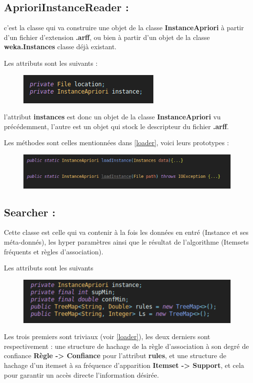 			\subsection*{AprioriInstanceReader :} \label{loader} c'est la classe qui va construire une objet de la classe \textbf{InstanceApriori} à partir d'un fichier d'extension \textbf{.arff}, ou bien à partir d'un objet de la classe \textbf{weka.Instances} classe déjà existant.
			\par Les attributs sont les suivants : 
			\begin{figure}[H]
				\centering
				\includegraphics[width=0.75\linewidth]{apriori/images/data_structs/laoder/properties.png}
			\end{figure}
			\par l'attribut \textbf{instances} est donc un objet de la classe \textbf{InstanceApriori} vu précédemment, l'autre est un objet qui stock le descripteur du fichier \textbf{.arff}.
			
			\par 
			Les méthodes sont celles mentionnées dans \ref{loader}, voici leurs prototypes :
			\begin{figure}[H]
				\centering
				\includegraphics[width=0.75\linewidth]{apriori/images/data_structs/laoder/methods.png}
			\end{figure}
			
			\subsection*{Searcher :} 
			Cette classe est celle qui va contenir à la fois les données en entré (Instance et ses méta-donnés), les hyper paramètres ainsi que le résultat de l'algorithme (Itemsets fréquents et règles d'association).
			\par
			Les attributs sont les suivants 
			\begin{figure}[H]
				\centering
				\includegraphics[width=0.75\linewidth]{apriori/images/data_structs/searcher/props.png}
			\end{figure}
			\par Les trois premiers sont triviaux (voir \ref{loader}), les deux derniers sont respectivement : une structure de hachage de la règle d'association à son degré de confiance \textbf{Règle -> Confiance} pour l'attribut \textbf{rules}, et une structure de hachage d'un itemset à sa fréquence d'apparition \textbf{Itemset -> Support}, et cela pour garantir un accès directe l'information désirée.
			
